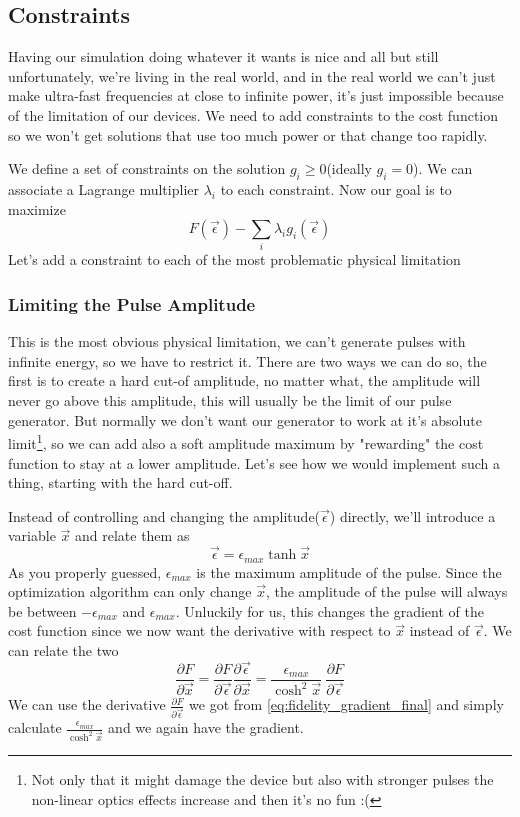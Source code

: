 \documentclass[english, a4paper, 12pt, twoside]{article}
\numberwithin{equation}{section} %
\begin{document}
\subsection{Constraints}
Having our simulation doing whatever it wants is nice and all but still unfortunately, we're living in the real world, and in the real world we can't just make ultra-fast frequencies at close to infinite power, it's just impossible because of the limitation of our devices. We need to add constraints to the cost function so we won't get solutions that use too much power or that change too rapidly.

We define a set of constraints on the solution ${g_i \ge 0}$(ideally $g_i=0$). We can associate a Lagrange multiplier $\lambda_i$ to each constraint. \newline
Now our goal is to maximize 
$$F(\vec{\epsilon}) - \sum_i \lambda_i g_i(\vec{\epsilon})$$
Let's add a constraint to each of the most problematic physical limitation
\subsubsection{Limiting the Pulse Amplitude}
This is the most obvious physical limitation, we can't generate pulses with infinite energy, so we have to restrict it. There are two ways we can do so, the first is to create a hard cut-of amplitude, no matter what, the amplitude will never go above this amplitude, this will usually be the limit of our pulse generator. But normally we don't want our generator to work at it's absolute limit\footnote{Not only that it might damage the device but also with stronger pulses the non-linear optics effects increase and then it's no fun :(}, so we can add also a soft amplitude maximum by "rewarding" the cost function to stay at a lower amplitude. Let's see how we would implement such a thing, starting with the hard cut-off.

Instead of controlling and changing the amplitude($\vec{\epsilon}$) directly, we'll introduce a variable $\vec{x}$ and relate them as
$$\vec{\epsilon} = \epsilon_{max}\tanh{\vec{x}}$$
As you properly guessed, $\epsilon_{max}$ is the maximum amplitude of the pulse.
Since the optimization algorithm can only change $\vec{x}$, the amplitude of the pulse will always be between $-\epsilon_{max}$ and $\epsilon_{max}$. Unluckily for us, this changes the gradient of the cost function since we now want the derivative with respect to $\vec{x}$ instead of $\vec{\epsilon}$. We can relate the two
\[
\frac{\partial F}{\partial \vec{x}} = \frac{\partial F}{\partial \vec{\epsilon}}\frac{\partial \vec{\epsilon}}{\partial \vec{x}} = \frac{\epsilon_{max}}{\cosh^2{\vec{x}}} \ \frac{\partial F}{\partial \vec{\epsilon}}
\]
We can use the derivative $\frac{\partial F}{\partial \vec{\epsilon}}$ we got from \ref{eq:fidelity_gradient_final} and simply calculate $\frac{\epsilon_{max}}{\cosh^2{\vec{x}}}$ and we again have the gradient.
\end{document}
